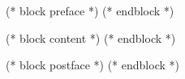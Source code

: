 \documentclass[((booktype)),
				(* for option in bookoptions *)((option)),
				(* endfor *)
				(* for instrument in instruments *)((instrument)),
				(* endfor *)
				((mainfontsize))pt]{crepbook}
\begin{document}
\maketitle
(* block preface *)
(* endblock *)

(* block content *)
(* endblock *)

(* block postface *)
(* endblock *)
\end{document}
